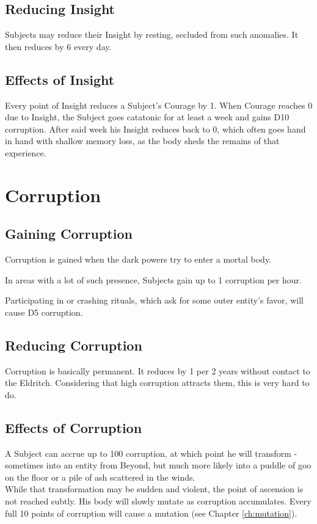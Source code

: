 \documentclass[11pt,a4paper,openany]{book}
\begin{document}
	\subsection{Reducing Insight}
	Subjects may reduce their Insight by resting,
		secluded from such anomalies.
	It then reduces by 6 every day.
	\subsection{Effects of Insight}
	Every point of Insight reduces a Subject's Courage by 1.
	When Courage reaches 0 due to Insight,
		the Subject goes catatonic for at least a week and gains D10 corruption.
	After said week his Insight reduces back to 0,
		which often goes hand in hand with shallow memory loss,
		as the body sheds the remains of that experience.
	
	\section{Corruption}
	\subsection{Gaining Corruption}
	Corruption is gained when the dark powers try to enter a mortal body.
	\begin{sitemize}[8]
		\item In areas with a lot of such presence, Subjects gain up to 1 corruption per hour.
		\item Participating in or crashing rituals, which ask for some outer entity's favor, will cause D5 corruption.
	\end{sitemize}
	\subsection{Reducing Corruption}
	Corruption is basically permanent.
	It reduces by 1 per 2 years without contact to the Eldritch.
	Considering that high corruption attracts them, this is very hard to do.
	\subsection{Effects of Corruption}
	A Subject can accrue up to 100 corruption, at which point he will transform
		- sometimes into an entity from Beyond,
		but much more likely into
		a puddle of goo on the floor
		or a pile of ash scattered in the winds.
		\\%
	While that transformation may be sudden and violent,
		the point of ascension is not reached subtly.
	His body will slowly mutate as corruption accumulates.
	Every full 10 points of corruption will cause a mutation (see Chapter \ref{ch:mutation}).
	
\end{document}
